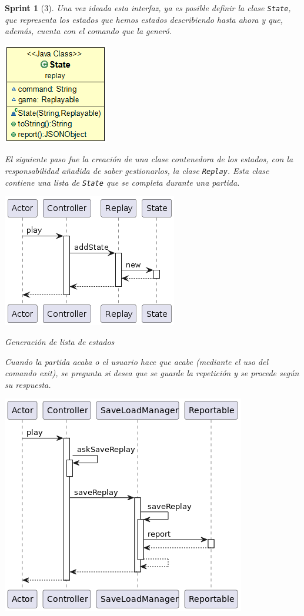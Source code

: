 \documentclass[12pt,a4paper,openright]{book}
\theoremstyle{break}
\newtheorem*{sprint}{Sprint}
\begin{document}
\begin{sprint}[3]
Una vez ideada esta interfaz, ya es posible definir la clase \texttt{State}, que representa los estados que hemos estados describiendo hasta ahora y que, además, cuenta con el comando que la generó.

\begin{center}
\includegraphics[scale=0.5]{state-sprint-3.png}
\end{center}

El siguiente paso fue la creación de una clase contenedora de los estados, con la responsabilidad añadida de saber gestionarlos, la clase \texttt{Replay}. Esta clase contiene una lista de \texttt{State} que se completa durante una partida.

\begin{center}
\includegraphics[scale=0.6]{addState-replay-sprint-3.png}

Generación de lista de estados
\end{center}

Cuando la partida acaba o el usuario hace que acabe (mediante el uso del comando exit), se pregunta si desea que se guarde la repetición y se procede según su respuesta.

\begin{center}
\includegraphics[scale=0.6]{saveReplay-sprint3.png}


\end{center}
\end{sprint}
\end{document}
